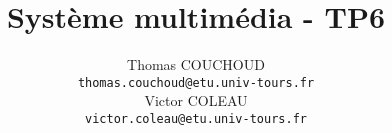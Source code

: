 \documentclass{report}
\title{Système multimédia - TP6}
\author{Thomas COUCHOUD\\\texttt{thomas.couchoud@etu.univ-tours.fr}\\Victor COLEAU\\\texttt{victor.coleau@etu.univ-tours.fr}}
\begin{document}
	\mccTitle
		
\end{document}
